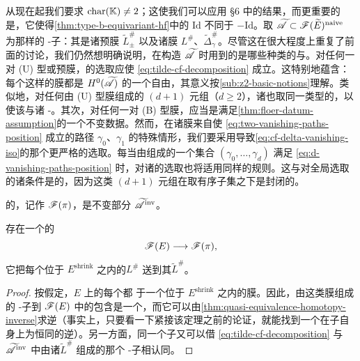 从现在起我们要求 $\mathrm{char}(\mathbb{K})\neq 2$；这使我们可以应用 §6 中的结果，而更重要的是，它使得\cref{thm:type-b-equivariant-hf}中的 $\mathrm{Id}$ 不同于 $-\mathrm{Id}$。取 $\widetilde{\mathscr{A}}\subset\mathscr{F}(\widetilde{E})^{\mathrm{naive}}$ 为那样的\trFull{} \trAinfty-子\trCategory：其\trObject{}是诸预\trEquivariant{}膜 $\widetilde{L}^{\#}_{\pm}$ 以及诸\trEquivariant{}膜 $L^{\#}$、$\widetilde{\Delta}^{\#}_\gamma$。尽管这在很大程度上重复了前面的讨论，我们仍然想明确说明，在构造 $\widetilde{\mathscr{A}}$ 时用到的是哪些种类的\trFloerDatum{}与\trPerturbationDatum。对任何一对 (U) 型\trEquivariant{}或预\trEquivariant{}膜，\trFloerDatum{}的选取应使 \eqref{eq:tilde-cf-decomposition} 成立。这特别地蕴含：每个这样的膜都是 $H^0(\widetilde{\mathscr{A}})$ 的一个自由\trObject，其意义按\cref{sub:z2-basic-notions}理解。类似地，对任何由 (U) 型膜组成的 $(d{+}1)$ 元组（$d\ge 2$），诸\trPerturbationDatum{}也取同一类型的，以使该\trIsomorphism{}与诸 \trAinfty-\trStructureMap{}\trCompatible。其次，对任何一对 (B) 型\trEquivariant{}膜，\trFloerDatum{}应当是满足\cref{thm:floer-datum-assumption}的一个不变数据。然而，在诸膜来自使 \eqref{eq:two-vanishing-paths-position} 成立的路径 $\gamma_0$、$\gamma_1$ 的特殊情形，我们要采用导致\trIsomorphism{}\eqref{eq:cf-delta-vanishing-iso}的那个更严格的选取。每当由\trVanishingPath{}组成的一个集合 $(\gamma_0,\ldots,\gamma_d)$ 满足 \eqref{eq:d-vanishing-paths-position} 时，对诸\trPerturbationDatum{}的选取也将适用同样的规则。这与对全局选取的诸\trConsistency{}条件是\trCompatible{}的，因为这类 $(d{+}1)$ 元组在取有序子集之下是封闭的。
\begin{definition}\label{thm:fukaya-category-lefschetz-fibration}
\trLefschetzFibration{}的\trFukayaCategory，记作 $\mathscr{F}(\pi)$，是不变部分 $\widetilde{\mathscr{A}}^{\mathrm{inv}}$。
\end{definition}
\begin{proposition}\label{thm:full-embedding-functor}
存在一个\trCohomology{}\trFullyFaithful{}的 \trAFunctor
\begin{equation*}
\mathscr{F}(E)\longrightarrow\mathscr{F}(\pi),
\end{equation*}
它把每个位于 $E^{\mathrm{shrink}}$ 之内的\trExactLagrangianBrane{}$L^{\#}$ 送到其\trPreimage{}$\widetilde{L}^{\#}$。
\end{proposition}
\begin{proof}
按假定，$E$ 上的每个\trExactLagrangianBrane{}都 \trIsotopy{}于一个位于 $E^{\mathrm{shrink}}$ 之内的膜。因此，由这类膜组成的\trFull{} \trAinfty-子\trCategory{}到 $\mathscr{F}(E)$ 中的包含是一个\trQuasiequivalence，而它可以由\cref{thm:quasi-equivalence-homotopy-inverse}求逆（事实上，只要看一下紧接该定理之前的论证，就能找到一个在子\trCategory{}自身上为恒同的逆\trQuasiequivalence）。另一方面，同一个子\trCategory{}又可以借 \eqref{eq:tilde-cf-decomposition} 与 $\widetilde{\mathscr{A}}^{\mathrm{inv}}$ 中由诸\trObject{}$\widetilde{L}^{\#}$ 组成的那个\trFull{} \trAinfty-子\trCategory{}相认同。
\end{proof}
